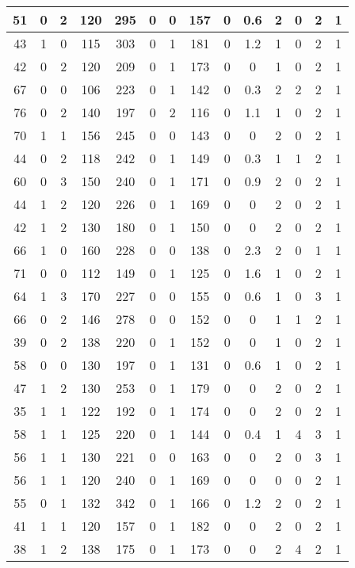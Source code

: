 \documentclass{article}
\begin{document}
\begin{longtable}{|c|c|c|c|c|c|c|c|c|c|c|c|c|c|}
51 & 0 & 2 & 120 & 295 & 0 & 0 & 157 & 0 & 0.6 & 2 & 0 & 2 & 1\\ \hline
43 & 1 & 0 & 115 & 303 & 0 & 1 & 181 & 0 & 1.2 & 1 & 0 & 2 & 1\\ \hline
42 & 0 & 2 & 120 & 209 & 0 & 1 & 173 & 0 & 0 & 1 & 0 & 2 & 1\\ \hline
67 & 0 & 0 & 106 & 223 & 0 & 1 & 142 & 0 & 0.3 & 2 & 2 & 2 & 1\\ \hline
76 & 0 & 2 & 140 & 197 & 0 & 2 & 116 & 0 & 1.1 & 1 & 0 & 2 & 1\\ \hline
70 & 1 & 1 & 156 & 245 & 0 & 0 & 143 & 0 & 0 & 2 & 0 & 2 & 1\\ \hline
44 & 0 & 2 & 118 & 242 & 0 & 1 & 149 & 0 & 0.3 & 1 & 1 & 2 & 1\\ \hline
60 & 0 & 3 & 150 & 240 & 0 & 1 & 171 & 0 & 0.9 & 2 & 0 & 2 & 1\\ \hline
44 & 1 & 2 & 120 & 226 & 0 & 1 & 169 & 0 & 0 & 2 & 0 & 2 & 1\\ \hline
42 & 1 & 2 & 130 & 180 & 0 & 1 & 150 & 0 & 0 & 2 & 0 & 2 & 1\\ \hline
66 & 1 & 0 & 160 & 228 & 0 & 0 & 138 & 0 & 2.3 & 2 & 0 & 1 & 1\\ \hline
71 & 0 & 0 & 112 & 149 & 0 & 1 & 125 & 0 & 1.6 & 1 & 0 & 2 & 1\\ \hline
64 & 1 & 3 & 170 & 227 & 0 & 0 & 155 & 0 & 0.6 & 1 & 0 & 3 & 1\\ \hline
66 & 0 & 2 & 146 & 278 & 0 & 0 & 152 & 0 & 0 & 1 & 1 & 2 & 1\\ \hline
39 & 0 & 2 & 138 & 220 & 0 & 1 & 152 & 0 & 0 & 1 & 0 & 2 & 1\\ \hline
58 & 0 & 0 & 130 & 197 & 0 & 1 & 131 & 0 & 0.6 & 1 & 0 & 2 & 1\\ \hline
47 & 1 & 2 & 130 & 253 & 0 & 1 & 179 & 0 & 0 & 2 & 0 & 2 & 1\\ \hline
35 & 1 & 1 & 122 & 192 & 0 & 1 & 174 & 0 & 0 & 2 & 0 & 2 & 1\\ \hline
58 & 1 & 1 & 125 & 220 & 0 & 1 & 144 & 0 & 0.4 & 1 & 4 & 3 & 1\\ \hline
56 & 1 & 1 & 130 & 221 & 0 & 0 & 163 & 0 & 0 & 2 & 0 & 3 & 1\\ \hline
56 & 1 & 1 & 120 & 240 & 0 & 1 & 169 & 0 & 0 & 0 & 0 & 2 & 1\\ \hline
55 & 0 & 1 & 132 & 342 & 0 & 1 & 166 & 0 & 1.2 & 2 & 0 & 2 & 1\\ \hline
41 & 1 & 1 & 120 & 157 & 0 & 1 & 182 & 0 & 0 & 2 & 0 & 2 & 1\\ \hline
38 & 1 & 2 & 138 & 175 & 0 & 1 & 173 & 0 & 0 & 2 & 4 & 2 & 1\\ \hline

\end{longtable}
\end{document}
